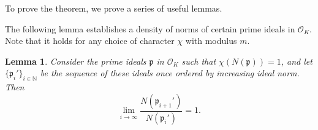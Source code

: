 \documentclass[12pt]{amsart}
\newtheorem{lemma}[theorem]{Lemma}
\theoremstyle{definition}
\numberwithin{equation}{section}
\newcommand{\p}{\mathfrak{p}}
\newcommand{\N}{\mathbb{N}}
\begin{document}
To prove the theorem, we prove a series of useful lemmas. 





The following lemma establishes a density of norms of certain prime ideals in $\mathcal{O}_K$. Note that it holds for any choice of character $\chi$ with modulus $m$.

\begin{lemma} \label{adj-ideal}
    Consider the prime ideals $\p$ in $\mathcal{O}_K$ such that $\chi(N(\p)) = 1$, and let $\{\p_i'\}_{i \in \N}$ be the sequence of these ideals once ordered by increasing ideal norm. Then $$\lim_{i \rightarrow \infty} \frac{N(\p_{i+1}')}{N(\p_i')} = 1.$$
\end{lemma}
\end{document}
